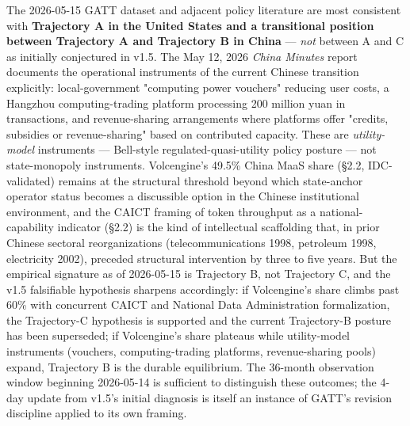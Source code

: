 \documentclass[11pt,a4paper]{article}
\begin{document}
The 2026-05-15 GATT dataset and adjacent policy literature are most consistent with \textbf{Trajectory A in the United States and a transitional position between Trajectory A and Trajectory B in China} --- \emph{not} between A and C as initially conjectured in v1.5. The May 12, 2026 \emph{China Minutes} report \cite{chinaminutes2026electricity} documents the operational instruments of the current Chinese transition explicitly: local-government "computing power vouchers" reducing user costs, a Hangzhou computing-trading platform processing 200 million yuan in transactions, and revenue-sharing arrangements where platforms offer "credits, subsidies or revenue-sharing" based on contributed capacity. These are \emph{utility-model} instruments --- Bell-style regulated-quasi-utility policy posture --- not state-monopoly instruments. Volcengine's 49.5\% China MaaS share (§2.2, IDC-validated) remains at the structural threshold beyond which state-anchor operator status becomes a discussible option in the Chinese institutional environment, and the CAICT framing of token throughput as a national-capability indicator (§2.2) is the kind of intellectual scaffolding that, in prior Chinese sectoral reorganizations (telecommunications 1998, petroleum 1998, electricity 2002), preceded structural intervention by three to five years. But the empirical signature as of 2026-05-15 is Trajectory B, not Trajectory C, and the v1.5 falsifiable hypothesis sharpens accordingly: if Volcengine's share climbs past 60\% with concurrent CAICT and National Data Administration formalization, the Trajectory-C hypothesis is supported and the current Trajectory-B posture has been superseded; if Volcengine's share plateaus while utility-model instruments (vouchers, computing-trading platforms, revenue-sharing pools) expand, Trajectory B is the durable equilibrium. The 36-month observation window beginning 2026-05-14 is sufficient to distinguish these outcomes; the 4-day update from v1.5's initial diagnosis is itself an instance of GATT's revision discipline applied to its own framing.
\end{document}

